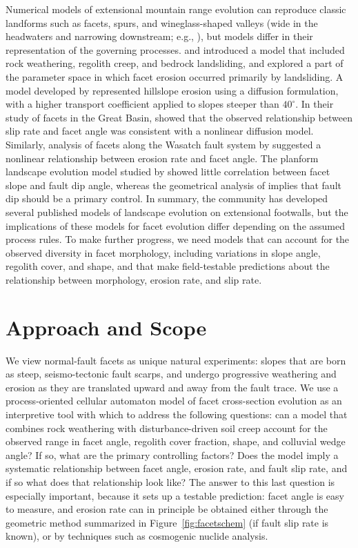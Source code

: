 Numerical models of extensional mountain range evolution can reproduce classic landforms such as facets, spurs, and wineglass-shaped valleys (wide in the headwaters and narrowing downstream; e.g., \citep{leeder1993interaction}), but models differ in their representation of the governing processes. \citet{densmore1998landsliding} and \citet{ellis1999development} introduced a model that included rock weathering, regolith creep, and bedrock landsliding, and explored a part of the parameter space in which facet erosion occurred primarily by landsliding. A model developed by \citet{petit2009faceted} represented hillslope erosion using a diffusion formulation, with a higher transport coefficient applied to slopes steeper than $40^\circ$. In their study of facets in the Great Basin, \citet{depolo2000estimating} showed that the observed relationship between slip rate and facet angle was consistent with a nonlinear diffusion model. Similarly, analysis of facets along the Wasatch fault system by \citet{struble2019mountain} suggested a nonlinear relationship between erosion rate and facet angle. The planform landscape evolution model studied by \citet{petit2009faceted} showed little correlation between facet slope and fault dip angle, whereas the geometrical analysis of \citet{tucker2011geomorphic} implies that fault dip should be a primary control. In summary, the community has developed several published models of landscape evolution on extensional footwalls, but the implications of these models for facet evolution differ depending on the assumed process rules. To make further progress, we need models that can account for the observed diversity in facet morphology, including variations in slope angle, regolith cover, and shape, and that make field-testable predictions about the relationship between morphology, erosion rate, and slip rate.


\section{Approach and Scope}

We view normal-fault facets as unique natural experiments: slopes that are born as steep, seismo-tectonic fault scarps, and undergo progressive weathering and erosion as they are translated upward and away from the fault trace. We use a process-oriented cellular automaton model of facet cross-section evolution as an interpretive tool with which to address the following questions: can a model that combines rock weathering with disturbance-driven soil creep account for the observed range in facet angle, regolith cover fraction, shape, and colluvial wedge angle? If so, what are the primary controlling factors? Does the model imply a systematic relationship between facet angle, erosion rate, and fault slip rate, and if so what does that relationship look like? The answer to this last question is especially important, because it sets up a testable prediction: facet angle is easy to measure, and erosion rate can in principle be obtained either through the geometric method summarized in Figure~\ref{fig:facetschem} (if fault slip rate is known), or by techniques such as cosmogenic nuclide analysis.

